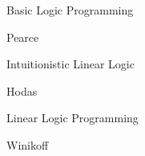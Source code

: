 \begin{pgroup}{Basic Logic Programming}
  \begin{paper}{Pearce}
    \mustread
  \end{paper}
\end{pgroup}

\begin{pgroup}{Intuitionistic Linear Logic}
  \begin{paper}{Hodas}
    \mustread
  \end{paper}
\end{pgroup}

\begin{pgroup}{Linear Logic Programming}
  \begin{paper}{Winikoff}
    \mustread
  \end{paper}
\end{pgroup}
